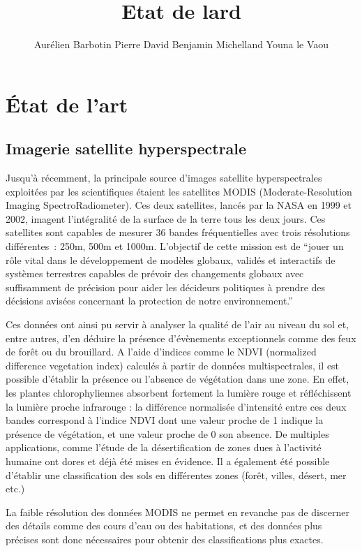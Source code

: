 \documentclass[a4paper,10pt]{article}
\title{Etat de lard}
\author{Aurélien Barbotin Pierre David Benjamin Michelland Youna le Vaou}
\begin{document}
\maketitle

\section{État de l'art}
\subsection{Imagerie satellite hyperspectrale}

Jusqu'à récemment, la principale source d'images satellite hyperspectrales exploitées par les scientifiques étaient les satellites MODIS (Moderate-Resolution Imaging SpectroRadiometer). Ces deux satellites, lancés par la NASA en 1999 et 2002, imagent l'intégralité de la surface de la terre tous les deux jours. Ces satellites sont capables de mesurer 36 bandes fréquentielles avec trois résolutions différentes : 250m, 500m et 1000m\cite{nasa}. L'objectif de cette mission est de ``jouer un rôle vital dans le développement de modèles globaux, validés et interactifs de systèmes terrestres capables de prévoir des changements globaux avec suffisamment de précision pour aider les décideurs politiques à prendre des décisions avisées concernant la protection de notre environnement.''

Ces données ont ainsi pu servir à analyser la qualité de l'air au niveau du sol et, entre autres, d'en déduire la présence d'évènements exceptionnels comme des feux de forêt ou du brouillard\cite{airSurv}. A l'aide d'indices comme le NDVI (normalized difference vegetation index) calculés à partir de données multispectrales, il est possible d'établir la présence ou l'absence de végétation dans une zone. En effet, les plantes chlorophyliennes absorbent fortement la lumière rouge et réfléchissent la lumière proche infrarouge : la différence normalisée d'intensité entre ces deux bandes correspond à l'indice NDVI dont une valeur proche de 1 indique la présence de végétation, et une valeur proche de 0 son absence. De multiples applications, comme l'étude de la désertification de zones dues à l'activité humaine\cite{desert} ont dores et déjà été mises en évidence. Il a également été possible d'établir une classification des sols \cite{mapping} en différentes zones (forêt, villes, désert, mer etc.)

La faible résolution des données MODIS ne permet en revanche pas de discerner des détails comme des cours d'eau ou des habitations, et des données plus précises sont donc nécessaires pour obtenir des classifications plus exactes. 
\end{document}
